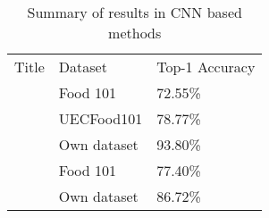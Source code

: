 \begin{table}[h]
	\centering
	\caption{Summary of results in CNN based methods}
	\label{cnn_summary}
	\begin{tabular}{lll}
		Title                                & Dataset     & Top-1 Accuracy \\
		\textcite{deepLearning} 			 & Food 101    & 72.55\%  \\
		\textcite{yanaiFood}               	 & UECFood101  & 78.77\%  \\
		\textcite{kagayaFood}       		 & Own dataset & 93.80\%   \\
		\textcite{deepFood}                  & Food 101    & 77.40\%  	\\
		\textcite{nutrinet}                  & Own dataset & 86.72\%
	\end{tabular}
\end{table}

